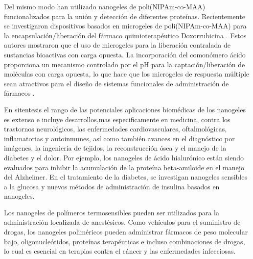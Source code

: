 Del mismo modo \citet{Culver2017A}han utilizado nanogeles de poli(NIPAm-co-MAA) funcionalizados para la uni\'on y detecci\'on de diferentes prote\'inas. 
Recientemente se investigaron dispositivos basados en microgeles de poli(NIPAm-co-MAA) para la encapsulación/liberaci\'on del f\'armaco quimioterap\'eutico Doxorrubicina \cite{Giussi2020, MartinezMoro2020, Pergushov2020}. Estos autores mostraron que el uso de microgeles para la liberaci\'on contralada de sustancias bioactivas con carga opuesta. 
La incorporaci\'on del comon\'omero \'acido proporciona un mecanismo controlado por el pH para la captaci\'on/liberaci\'on de mol\'eculas con carga opuesta, lo que hace que los microgeles de respuesta m\'ultiple sean atractivos para el dise\~no de sistemas funcionales de administraci\'on de f\'armacos \cite{Liu2017}.

En sitentesis el  rango de las potenciales aplicaciones biom\'edicas de los nanogeles es extenso e incluye desarrollos,mas especificamente en medicina, contra los trastornos neurol\'ogicos, las enfermedades cardiovasculares, oftalmol\'ogicas, inflamatorias y autoinmunes, as\'i como tambi\'en avances en el diagn\'ostico por im\'agenes, la ingenier\'ia de tejidos, la reconstrucci\'on \'osea y el manejo de la diabetes y el dolor. Por ejemplo, los nanogeles de \'acido hialur\'onico est\'an siendo evaluados para inhibir la acumulaci\'on de la prote\'ina beta-amiloide en el manejo del Alzheimer. En el tratamiento de la diabetes, se investigan nanogeles sensibles a la glucosa y nuevos m\'etodos de administraci\'on de insulina basados en nanogeles.

Los nanogeles de pol\'imeros termosensibles pueden ser utilizados para la administraci\'on localizada de anest\'esicos. Como veh\'iculos para el suministro de drogas, los nanogeles polim\'ericos pueden administrar f\'armacos de peso molecular bajo, oligonucle\'otidos, prote\'inas terap\'euticas e incluso combinaciones de drogas, lo cual es esencial en terapias contra el c\'ancer y las enfermedades infecciosas.

